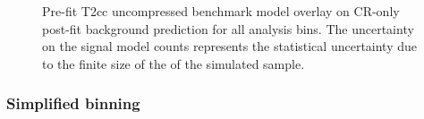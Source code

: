 \begin{figure}[h!]
\begin{center}
{            \label{fig:T2cc_compressed_MR_4j}
        } \\
         ~~
         \\
        \caption{
            Pre-fit T2cc uncompressed benchmark model overlay on CR-only
            post-fit background prediction for all analysis bins. The
            uncertainty on the signal model counts represents the statistical
            uncertainty due to the finite size of the of the simulated sample.
        }
        \label{fig:T2cc_compressed_MR}
    \end{center}
\end{figure}


\subsubsection{Simplified binning}

